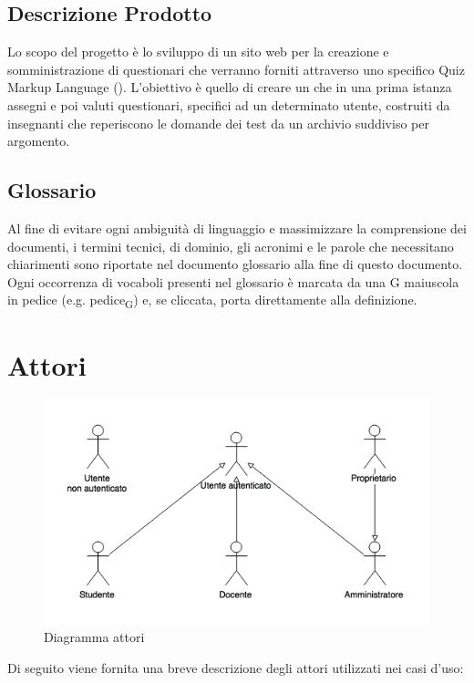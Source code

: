 \documentclass[12pt,a4paper]{article}
\begin{document}
\subsection{Descrizione Prodotto}
Lo scopo del progetto è lo sviluppo di un sito web per la creazione e somministrazione di questionari che verranno forniti attraverso uno specifico Quiz Markup Language (). L'obiettivo è quello di creare un  che in una prima istanza assegni e poi valuti questionari, specifici ad un determinato utente, costruiti da insegnanti che reperiscono le domande dei test da un archivio suddiviso per argomento.

\subsection{Glossario}
Al fine di evitare ogni ambiguità di linguaggio e massimizzare la comprensione dei documenti, i termini tecnici, di dominio, gli acronimi e le parole che necessitano chiarimenti sono riportate nel documento glossario alla fine di questo documento. Ogni occorrenza di vocaboli presenti nel glossario è marcata da una G maiuscola in pedice (e.g. pedice\textsubscript{G}) e, se cliccata, porta direttamente alla definizione.

\newpage
\section{Attori}

\begin{figure}[H]
    \includegraphics[width=\textwidth]{diagramUCActors.png}
    \caption{Diagramma attori}
\end{figure}

Di seguito viene fornita una breve descrizione degli attori utilizzati nei casi d'uso:
\end{document}
